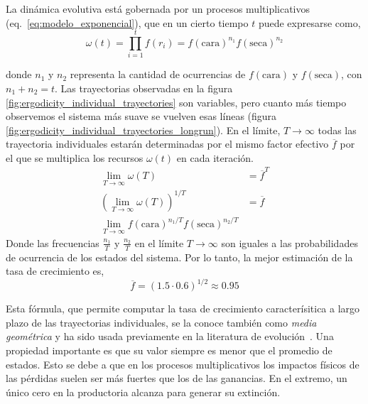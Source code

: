 \documentclass[a4paper,10pt]{article}
\begin{document}
La dinámica evolutiva está gobernada por un procesos multiplicativos (eq.~\ref{eq:modelo_exponencial}), que en un cierto tiempo $t$ puede expresarse como,
\begin{equation}
\omega(t) = \prod^t_{i=1} f(r_i) = f(\text{cara})^{n_1} f(\text{seca})^{n_2}
\end{equation}

donde $n_1$ y $n_2$ representa la cantidad de ocurrencias de $f(\text{cara})$ y $f(\text{seca})$, con $n_1 + n_2 = t$.
Las trayectorias observadas en la figura \ref{fig:ergodicity_individual_trayectories} son variables, pero cuanto más tiempo observemos el sistema más suave se vuelven esas líneas (figura \ref{fig:ergodicity_individual_trayectories_longrun}).
En el límite, $T \rightarrow \infty$ todas las trayectoria individuales estarán determinadas por el mismo factor efectivo $\overline{f}$ por el que se multiplica los recursos $\omega(t)$ en cada iteración.
\begin{equation}
\begin{split}
\lim_{T \rightarrow \infty} \omega(T) & = \overline{f}^T \\
\left( \lim_{T \rightarrow \infty} \omega(T) \right)^{1/T} & =  \overline{f} \\
\lim_{T \rightarrow \infty} f(\text{cara})^{n_1/T} f(\text{seca})^{n_2/T} & 
 \end{split}
\end{equation}
Donde las frecuencias $\frac{n_1}{T}$ y $\frac{n_2}{T}$ en el límite $T \rightarrow \infty$ son iguales a las probabilidades de ocurrencia de los estados del sistema.
Por lo tanto, la mejor estimación de la tasa de crecimiento es,
\begin{equation}
\overline{f} = (1.5 \cdot 0.6)^{1/2} \approx 0.95
\end{equation}

Esta fórmula, que permite computar la tasa de crecimiento caracterísitica a largo plazo de las trayectorias individuales, se la conoce también como \emph{media geométrica} y ha sido usada previamente en la literatura de evolución~\cite{dempster1955-geometricMean}.
Una propiedad importante es que su valor siempre es menor que el promedio de estados.
Esto se debe a que en los procesos multiplicativos los impactos físicos de las pérdidas suelen ser más fuertes que los de las ganancias.
En el extremo, un único cero en la productoria alcanza para generar su extinción.

% 
\end{document}
